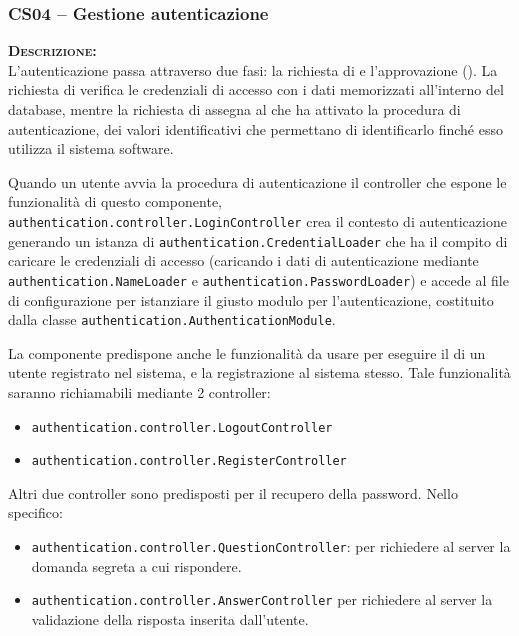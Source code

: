 \subsubsection{CS04 -- Gestione autenticazione}\label{sec:cs04}
\begin{description}
  \item{\scshape\bfseries Descrizione:}\\
L'autenticazione passa attraverso due fasi: la richiesta di  e l'approvazione (). La richiesta di  verifica le credenziali di accesso con i dati memorizzati all'interno del database, mentre la richiesta di  assegna al  che ha attivato la procedura di autenticazione, dei valori identificativi che permettano di identificarlo finché esso utilizza il sistema software.

Quando un utente avvia la procedura di autenticazione il controller che espone le funzionalità di questo componente, \texttt{authentication.controller.LoginController} crea il contesto di autenticazione generando un istanza di \texttt{authentication.CredentialLoader} che ha il compito di caricare le credenziali di accesso (caricando i dati di autenticazione mediante \texttt{authentication.NameLoader} e \texttt{authentication.PasswordLoader}) e accede al file di configurazione per istanziare il giusto modulo per l'autenticazione, costituito dalla classe \texttt{authentication.AuthenticationModule}.

La componente predispone anche le funzionalità da usare per eseguire il  di un utente registrato nel sistema, e la registrazione al sistema stesso. Tale funzionalità saranno richiamabili mediante 2 controller:
\begin{itemize}
	\item \texttt{authentication.controller.LogoutController}
	\item \texttt{authentication.controller.RegisterController}
\end{itemize}

Altri due controller sono predisposti per il recupero della password. Nello specifico: 

\begin{itemize}
	\item \texttt{authentication.controller.QuestionController}: per richiedere al server la domanda segreta a cui rispondere.
	\item \texttt{authentication.controller.AnswerController} per richiedere al server la validazione della risposta inserita dall'utente.
\end{itemize}


\end{description}
